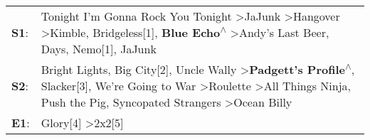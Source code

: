 \begin{supertabular}{p{0.03\textwidth}p{0.92\textwidth}}
 \textbf{S1}:  &                                       Tonight I'm Gonna Rock You Tonight\textsuperscript{} \textgreater \enspace JaJunk\textsuperscript{} \textgreater \enspace Hangover\textsuperscript{} \textgreater \enspace Kimble\textsuperscript{}, \enspace Bridgeless[1]\textsuperscript{}, \enspace \textbf{Blue Echo\textsuperscript{$\wedge$}} \textgreater \enspace Andy's Last Beer\textsuperscript{},  Days\textsuperscript{}, \enspace Nemo[1]\textsuperscript{}, \enspace JaJunk\textsuperscript{}  \enspace  \\
 \textbf{S2}:  &  Bright Lights, Big City[2]\textsuperscript{}, \enspace Uncle Wally\textsuperscript{} \textgreater \enspace \textbf{Padgett's Profile\textsuperscript{$\wedge$}}, \enspace Slacker[3]\textsuperscript{}, \enspace We're Going to War\textsuperscript{} \textgreater \enspace Roulette\textsuperscript{} \textgreater \enspace All Things Ninja\textsuperscript{}, \enspace Push the Pig\textsuperscript{}, \enspace Syncopated Strangers\textsuperscript{} \textgreater \enspace Ocean Billy\textsuperscript{}  \enspace  \\
 \textbf{E1}:  &                                                                                                                                                                                                                                                                                                                                                                                                                                      Glory[4]\textsuperscript{} \textgreater \enspace 2x2[5]\textsuperscript{}  \enspace  \\
\end{supertabular}
